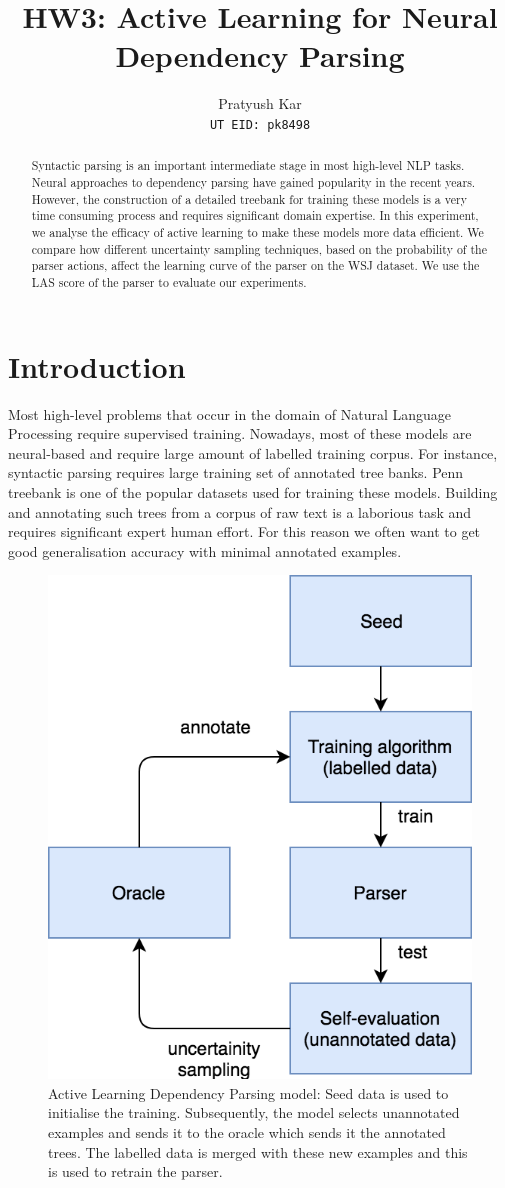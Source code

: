 \documentclass[11pt,letterpaper]{article}
\title{HW3: Active Learning for Neural Dependency Parsing}
\author{Pratyush Kar\\
  {\tt UT EID: pk8498}}
\date{}
\begin{document}
\maketitle

\begin{abstract}
Syntactic parsing is an important intermediate stage in most high-level NLP tasks. Neural approaches to dependency parsing have gained popularity in the recent years. However, the construction of a detailed treebank for training these models is a very time consuming process and requires significant domain expertise. In this experiment, we analyse the efficacy of active learning to make these models more data efficient. We compare how different uncertainty sampling techniques, based on the probability of the parser actions, affect the learning curve of the parser on the WSJ dataset. We use the LAS score of the parser to evaluate our experiments.
\end{abstract}

\section{Introduction}

Most high-level problems that occur in the domain of Natural Language Processing require supervised training. Nowadays, most of these models are neural-based and require large amount of labelled training corpus. For instance, syntactic parsing requires large training set of annotated tree banks. Penn treebank is one of the popular datasets used for training these models. Building and annotating such trees from a corpus of raw text is a laborious task and requires significant expert human effort. For this reason we often want to get good generalisation accuracy with minimal annotated examples.

\begin{figure}[h]
	\centering
	\includegraphics[width=0.6\linewidth]{flowchart}
	\caption{Active Learning Dependency Parsing model: Seed data is used to initialise the training. Subsequently, the model selects unannotated examples and sends it to the oracle which sends it the annotated trees. The labelled data is merged with these new examples and this is used to retrain the parser.}
	\label{fig:flowchart}
\end{figure}
\end{document}
